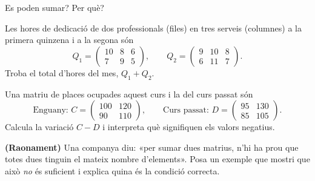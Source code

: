 \begin{exercicis}
\begin{exlist}
        Es poden sumar? Per què?
  \item Les hores de dedicació de dos professionals (files) en tres serveis
        (columnes) a la primera quinzena i a la segona són
        \[ Q_1=\begin{pmatrix} 10 & 8 & 6 \\ 7 & 9 & 5 \end{pmatrix},\qquad
           Q_2=\begin{pmatrix} 9 & 10 & 8 \\ 6 & 11 & 7 \end{pmatrix}. \]
        Troba el total d'hores del mes, $Q_1+Q_2$.
  \item Una matriu de places ocupades aquest curs i la del curs passat són
        \[ \text{Enguany: } C=\begin{pmatrix} 100 & 120 \\ 90 & 110 \end{pmatrix},\qquad
           \text{Curs passat: } D=\begin{pmatrix} 95 & 130 \\ 85 & 105 \end{pmatrix}. \]
        Calcula la variació $C-D$ i interpreta què signifiquen els valors negatius.
  \item \textbf{(Raonament)} Una companya diu: «per sumar dues matrius, n'hi ha
        prou que totes dues tinguin el mateix nombre d'elements». Posa un exemple
        que mostri que això \emph{no} és suficient i explica quina és la condició
        correcta.
\end{exlist}
\end{exercicis}

